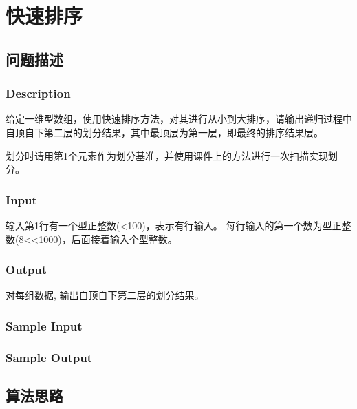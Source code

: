 \section{快速排序}
\subsection{问题描述}
\subsubsection*{Description}

给定一维型数组，使用快速排序方法，对其进行从小到大排序，请输出递归过程中自顶自下第二层的划分结果，其中最顶层为第一层，即最终的排序结果层。

划分时请用第1个元素作为划分基准，并使用课件上的方法进行一次扫描实现划分。

\subsubsection*{Input}

输入第1行有一个型正整数(<100)，表示有行输入。
每行输入的第一个数为型正整数(8<<1000)，后面接着输入个型整数。

\subsubsection*{Output}

对每组数据, 输出自顶自下第二层的划分结果。

\subsubsection*{Sample Input}




\subsubsection*{Sample Output}



\subsection{算法思路}

